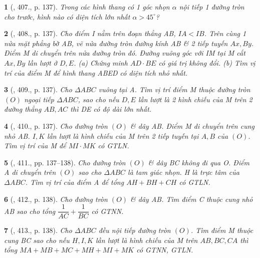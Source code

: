 \documentclass{article}
\newtheorem{baitoan}{}
\begin{document}
\begin{baitoan}[\cite{Binh_Toan_9_tap_2}, 407., p. 137]
	Trong các hình thang có 1 góc nhọn $\alpha$ nội tiếp 1 đường tròn cho trước, hình nào có diện tích lớn nhất $\alpha > 45^\circ$?
\end{baitoan}

\begin{baitoan}[\cite{Binh_Toan_9_tap_2}, 408., p. 137]
	Cho điểm I nằm trên đoạn thẳng AB, $IA < IB$. Trên cùng 1 nửa mặt phẳng bờ AB, vẽ nửa đường tròn đường kính AB \& 2 tiếp tuyến $Ax,By$. Điểm M di chuyển trên nửa đường tròn đó. Đường vuông góc với IM tại M cắt $Ax,By$ lần lượt ở $D,E$. (a) Chứng minh $AD\cdot BE$ có giá trị không đổi. (b) Tìm vị trí của điểm M để hình thang ABED có diện tích nhỏ nhất.
\end{baitoan}

\begin{baitoan}[\cite{Binh_Toan_9_tap_2}, 409., p. 137]
	Cho $\Delta ABC$ vuông tại A. Tìm vị trí điểm M thuộc đường tròn $(O)$ ngoại tiếp $\Delta ABC$, sao cho nếu $D,E$ lần lượt là 2 hình chiếu của M trên 2 đường thẳng $AB,AC$ thì DE có độ dài lớn nhất.
\end{baitoan}

\begin{baitoan}[\cite{Binh_Toan_9_tap_2}, 410., p. 137]
	Cho đường tròn $(O)$ \& dây AB. Điểm M di chuyển trên cung nhỏ AB. $I,K$ lần lượt là hình chiếu của M trên 2 tiếp tuyến tại $A,B$ của $(O)$. Tìm vị trí của M để $MI\cdot MK$ có {\rm GTLN}.
\end{baitoan}

\begin{baitoan}[\cite{Binh_Toan_9_tap_2}, 411., pp. 137--138]
	Cho đường tròn $(O)$ \& dây BC không đi qua O. Điểm A di chuyển trên $(O)$ sao cho $\Delta ABC$ là tam giác nhọn. H là trực tâm của $\Delta ABC$. Tìm vị trí của điểm A để tổng $AH + BH + CH$ có {\rm GTLN}.
\end{baitoan}

\begin{baitoan}[\cite{Binh_Toan_9_tap_2}, 412., p. 138]
	Cho đường tròn $(O)$ \& dây AB. Tìm điểm C thuộc cung nhỏ AB sao cho tổng $\dfrac{1}{AC} + \dfrac{1}{BC}$ có {\rm GTNN}.
\end{baitoan}

\begin{baitoan}[\cite{Binh_Toan_9_tap_2}, 413., p. 138]
	Cho $\Delta ABC$ đều nội tiếp đường tròn $(O)$. Tìm điểm M thuộc cung BC sao cho nếu $H,I,K$ lần lượt là hình chiếu của M trên $AB,BC,CA$ thì tổng $MA + MB + MC + MH + MI + MK$ có {\rm GTNN, GTLN}.
\end{baitoan}
\end{document}
